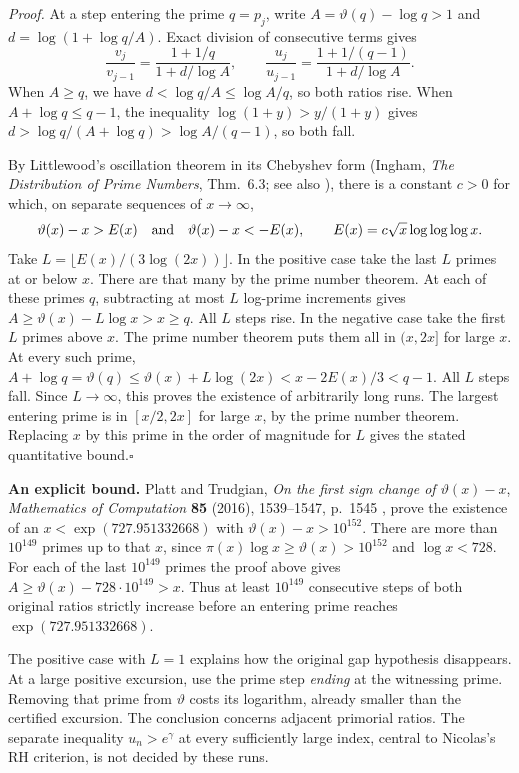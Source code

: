 \documentclass[11pt,a4paper]{article}
\begin{document}
\medskip\noindent\emph{Proof.}
At a step entering the prime $q=p_j$, write $A=\vartheta(q)-\log q>1$
and $d=\log(1+\log q/A)$. Exact division of consecutive terms gives
\[
 \frac{v_j}{v_{j-1}}=
 \frac{1+1/q}{1+d/\log A},\qquad
 \frac{u_j}{u_{j-1}}=
 \frac{1+1/(q-1)}{1+d/\log A}.
\]
When $A\ge q$, we have
$d<\log q/A\le \log A/q$, so both ratios rise.
When $A+\log q\le q-1$, the inequality $\log(1+y)>y/(1+y)$ gives
$d>\log q/(A+\log q)>\log A/(q-1)$, so both fall.

By Littlewood's oscillation theorem in its Chebyshev form
(Ingham, \emph{The Distribution of Prime Numbers}, Thm.~6.3; see also \cite[(2)--(3)]{PT}), there
is a constant $c>0$ for which, on separate sequences of $x\to\infty$,
\[
 \vartheta(x)-x>E(x)
 \quad\hbox{and}\quad
 \vartheta(x)-x<-E(x),\qquad
 E(x)=c\sqrt{x}\log\log\log x.
\]
Take $L=\lfloor E(x)/(3\log(2x))\rfloor$.
In the positive case take the last $L$ primes at or below $x$. There
are that many by the prime number theorem. At each of these primes
$q$, subtracting at most $L$ log-prime increments gives
$A\ge\vartheta(x)-L\log x>x\ge q$. All $L$ steps rise.
In the negative case take the first $L$ primes above $x$. The prime
number theorem puts them all in $(x,2x]$ for large $x$.
At every such prime,
$A+\log q=\vartheta(q)\le\vartheta(x)+L\log(2x)
<x-2E(x)/3<q-1$. All $L$ steps fall. Since $L\to\infty$,
this proves the existence of arbitrarily long runs. The largest
entering prime is in $[x/2,2x]$ for large $x$, by the prime number
theorem. Replacing $x$ by this prime in the order of magnitude for $L$
gives the stated quantitative bound.\hfill$\square$

\medskip\noindent\textbf{An explicit bound.}
Platt and Trudgian, \emph{On the first sign change of
$\vartheta(x)-x$}, \emph{Mathematics of Computation} \textbf{85}
(2016), 1539--1547, p.~1545 \cite{PT}, prove the existence of an
$x<\exp(727.951332668)$ with $\vartheta(x)-x>10^{152}$.
There are more than $10^{149}$ primes up to that $x$, since
$\pi(x)\log x\ge\vartheta(x)>10^{152}$ and $\log x<728$.
For each of the last $10^{149}$ primes the proof above gives
$A\ge\vartheta(x)-728\cdot10^{149}>x$.
Thus at least $10^{149}$ consecutive steps of both original ratios
strictly increase before an entering prime reaches
$\exp(727.951332668)$.

The positive case with $L=1$ explains how the original gap hypothesis
disappears. At a large positive excursion, use the prime step
\emph{ending} at the witnessing prime. Removing that prime from
$\vartheta$ costs its logarithm, already smaller than the certified
excursion. The conclusion concerns adjacent primorial ratios.
The separate inequality $u_n>e^\gamma$ at every sufficiently large
index, central to Nicolas's RH criterion, is not decided by these runs.
\end{document}

